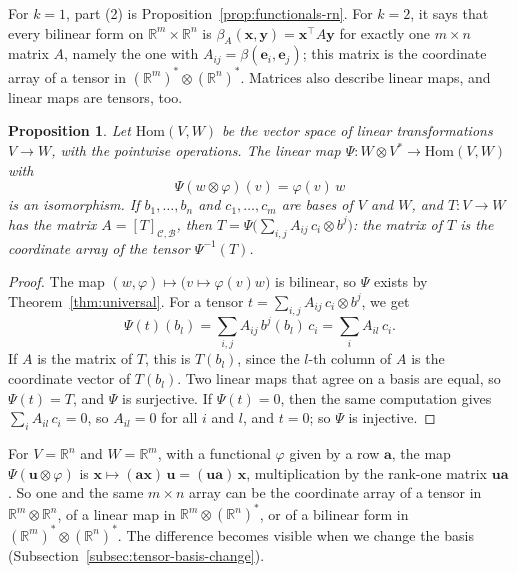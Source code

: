 \documentclass[11pt]{article}
\theoremstyle{definition}
\theoremstyle{plain}
\newtheorem{proposition}[definition]{Proposition}
\theoremstyle{remark}
\begin{document}
For $k = 1$, part (2) is Proposition~\ref{prop:functionals-rn}. For $k = 2$, it says that every bilinear form on $\mathbb{R}^m \times \mathbb{R}^n$ is $\beta_A(\mathbf{x}, \mathbf{y}) = \mathbf{x}^\top A\mathbf{y}$ for exactly one $m \times n$ matrix $A$, namely the one with $A_{ij} = \beta(\mathbf{e}_i, \mathbf{e}_j)$; this matrix is the coordinate array of a tensor in $(\mathbb{R}^m)^* \otimes (\mathbb{R}^n)^*$. Matrices also describe linear maps, and linear maps are tensors, too.

\begin{proposition}\label{prop:linear-maps-tensors}
    Let $\mathrm{Hom}(V, W)$ be the vector space of linear transformations $V \to W$, with the pointwise operations. The linear map $\Psi: W \otimes V^* \to \mathrm{Hom}(V, W)$ with
    \[\Psi(w \otimes \varphi)(v) = \varphi(v)\, w\]
    is an isomorphism. If $b_1, \ldots, b_n$ and $c_1, \ldots, c_m$ are bases of $V$ and $W$, and $T: V \to W$ has the matrix $A = [T]_{\mathcal{C}, \mathcal{B}}$, then $T = \Psi\big(\sum_{i,j} A_{ij}\, c_i \otimes b^j\big)$: the matrix of $T$ is the coordinate array of the tensor $\Psi^{-1}(T)$.
\end{proposition}

\begin{proof}
    The map $(w, \varphi) \mapsto \big(v \mapsto \varphi(v)w\big)$ is bilinear, so $\Psi$ exists by Theorem~\ref{thm:universal}. For a tensor $t = \sum_{i,j} A_{ij}\, c_i \otimes b^j$, we get
    \[\Psi(t)(b_l) = \sum_{i,j} A_{ij}\, b^j(b_l)\, c_i = \sum_i A_{il}\, c_i.\]
    If $A$ is the matrix of $T$, this is $T(b_l)$, since the $l$-th column of $A$ is the coordinate vector of $T(b_l)$. Two linear maps that agree on a basis are equal, so $\Psi(t) = T$, and $\Psi$ is surjective. If $\Psi(t) = 0$, then the same computation gives $\sum_i A_{il}\, c_i = 0$, so $A_{il} = 0$ for all $i$ and $l$, and $t = 0$; so $\Psi$ is injective.
\end{proof}

For $V = \mathbb{R}^n$ and $W = \mathbb{R}^m$, with a functional $\varphi$ given by a row $\mathbf{a}$, the map $\Psi(\mathbf{u} \otimes \varphi)$ is $\mathbf{x} \mapsto (\mathbf{a}\mathbf{x})\,\mathbf{u} = (\mathbf{u}\mathbf{a})\,\mathbf{x}$, multiplication by the rank-one matrix $\mathbf{u}\mathbf{a}$. So one and the same $m \times n$ array can be the coordinate array of a tensor in $\mathbb{R}^m \otimes \mathbb{R}^n$, of a linear map in $\mathbb{R}^m \otimes (\mathbb{R}^n)^*$, or of a bilinear form in $(\mathbb{R}^m)^* \otimes (\mathbb{R}^n)^*$. The difference becomes visible when we change the basis (Subsection~\ref{subsec:tensor-basis-change}).
\end{document}
